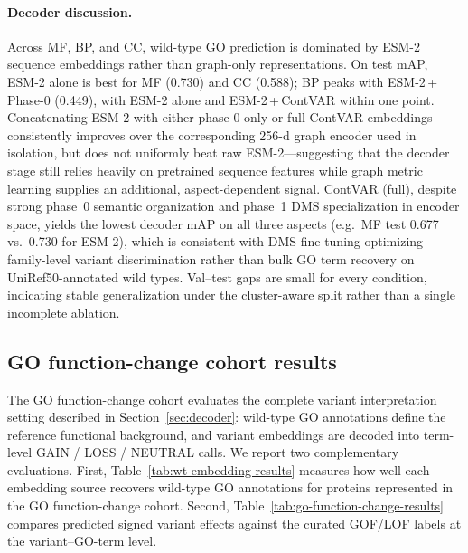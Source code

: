 \documentclass[11pt,a4paper]{article}
\begin{document}
\paragraph{Decoder discussion.}
Across MF, BP, and CC, wild-type GO prediction is dominated by ESM-2 sequence embeddings rather than graph-only representations. On test mAP, ESM-2 alone is best for MF (0.730) and CC (0.588); BP peaks with ESM-2\,+\,Phase-0 (0.449), with ESM-2 alone and ESM-2\,+\,ContVAR within one point. Concatenating ESM-2 with either phase-0-only or full ContVAR embeddings consistently improves over the corresponding 256-d graph encoder used in isolation, but does not uniformly beat raw ESM-2---suggesting that the decoder stage still relies heavily on pretrained sequence features while graph metric learning supplies an additional, aspect-dependent signal. ContVAR (full), despite strong phase~0 semantic organization and phase~1 DMS specialization in encoder space, yields the lowest decoder mAP on all three aspects (e.g.\ MF test 0.677 vs.\ 0.730 for ESM-2), which is consistent with DMS fine-tuning optimizing family-level variant discrimination rather than bulk GO term recovery on UniRef50-annotated wild types. Val--test gaps are small for every condition, indicating stable generalization under the cluster-aware split rather than a single incomplete ablation.

\subsection{GO function-change cohort results}
The GO function-change cohort evaluates the complete variant interpretation setting described in Section~\ref{sec:decoder}: wild-type GO annotations define the reference functional background, and variant embeddings are decoded into term-level GAIN / LOSS / NEUTRAL calls. We report two complementary evaluations. First, Table~\ref{tab:wt-embedding-results} measures how well each embedding source recovers wild-type GO annotations for proteins represented in the GO function-change cohort. Second, Table~\ref{tab:go-function-change-results} compares predicted signed variant effects against the curated GOF/LOF labels at the variant--GO-term level.
\end{document}

